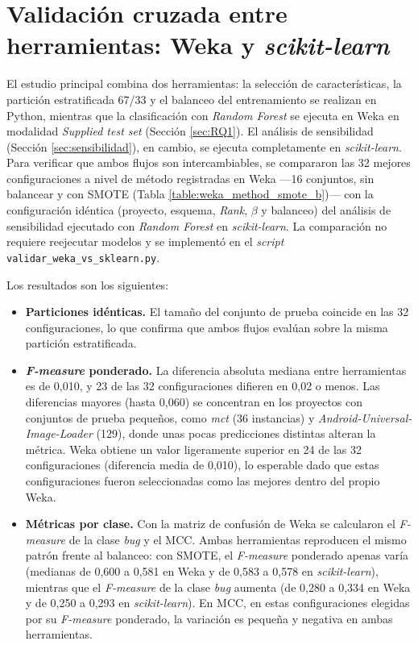 \section{Validación cruzada entre herramientas: Weka y \textit{scikit-learn}}
\label{sec:validacion_flujos}

El estudio principal combina dos herramientas: la selección de características, la partición estratificada 67/33 y el balanceo del entrenamiento se realizan en Python, mientras que la clasificación con \textit{Random Forest} se ejecuta en Weka en modalidad \textit{Supplied test set} (Sección \ref{sec:RQ1}). El análisis de sensibilidad (Sección \ref{sec:sensibilidad}), en cambio, se ejecuta completamente en \textit{scikit-learn}. Para verificar que ambos flujos son intercambiables, se compararon las 32 mejores configuraciones a nivel de método registradas en Weka ---16 conjuntos, sin balancear y con SMOTE (Tabla \ref{table:weka_method_smote_b})--- con la configuración idéntica (proyecto, esquema, \textit{Rank}, $\beta$ y balanceo) del análisis de sensibilidad ejecutado con \textit{Random Forest} en \textit{scikit-learn}. La comparación no requiere reejecutar modelos y se implementó en el \textit{script} \texttt{validar\_weka\_vs\_sklearn.py}.



Los resultados son los siguientes:

\begin{itemize}
    \item \textbf{Particiones idénticas.} El tamaño del conjunto de prueba coincide en las 32 configuraciones, lo que confirma que ambos flujos evalúan sobre la misma partición estratificada.
    \item \textbf{\textit{F-measure} ponderado.} La diferencia absoluta mediana entre herramientas es de 0,010, y 23 de las 32 configuraciones difieren en 0,02 o menos. Las diferencias mayores (hasta 0,060) se concentran en los proyectos con conjuntos de prueba pequeños, como \textit{mct} (36 instancias) y \textit{Android-Universal-Image-Loader} (129), donde unas pocas predicciones distintas alteran la métrica. Weka obtiene un valor ligeramente superior en 24 de las 32 configuraciones (diferencia media de 0,010), lo esperable dado que estas configuraciones fueron seleccionadas como las mejores dentro del propio Weka.
    \item \textbf{Métricas por clase.} Con la matriz de confusión de Weka se calcularon el \textit{F-measure} de la clase \textit{bug} y el MCC. Ambas herramientas reproducen el mismo patrón frente al balanceo: con SMOTE, el \textit{F-measure} ponderado apenas varía (medianas de 0,600 a 0,581 en Weka y de 0,583 a 0,578 en \textit{scikit-learn}), mientras que el \textit{F-measure} de la clase \textit{bug} aumenta (de 0,280 a 0,334 en Weka y de 0,250 a 0,293 en \textit{scikit-learn}). En MCC, en estas configuraciones elegidas por su \textit{F-measure} ponderado, la variación es pequeña y negativa en ambas herramientas.
\end{itemize}

